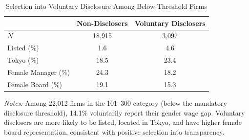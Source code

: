 \begin{table}[t]
\centering
\caption{Selection into Voluntary Disclosure Among Below-Threshold Firms}
\label{tab:selection}
\begin{tabular}{lcc}
\hline\hline
 & Non-Disclosers & Voluntary Disclosers \\
\hline
$N$ & 18,915 & 3,097 \\
Listed (\%) & 1.6 & 4.6 \\
Tokyo (\%) & 18.5 & 23.4 \\
Female Manager (\%) & 24.3 & 18.2 \\
Female Board (\%) & 19.1 & 15.3 \\
\hline\hline
\end{tabular}
\begin{tablenotes}\small
\item \textit{Notes:} Among 22,012 firms in the 101--300 category (below the mandatory disclosure threshold), 14.1\% voluntarily report their gender wage gap. Voluntary disclosers are more likely to be listed, located in Tokyo, and have higher female board representation, consistent with positive selection into transparency.
\end{tablenotes}
\end{table}

